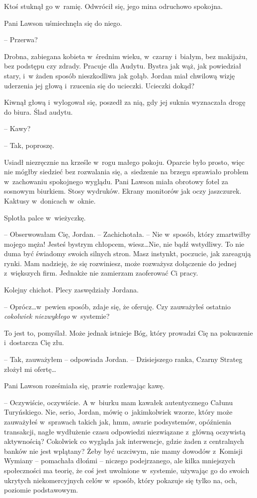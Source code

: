 \documentclass[oneside,polish,11pt,sfheadings]{mwbk}
\begin{document}
Ktoś stuknął go w~ramię. Odwrócił się, jego mina odruchowo spokojna.

Pani Lawson uśmiechnęła się do niego.

-- Przerwa?

Drobna, zabiegana kobieta w~średnim wieku, w~czarny i~białym, bez
makijażu, bez podstępu czy zdrady. Pracuje dla Audytu. Bystra jak wąż,
jak powiedział stary, i~w żaden sposób nieszkodliwa jak gołąb. Jordan
miał chwilową wizję uderzenia jej głową i~rzucenia się do ucieczki.
Ucieczki dokąd?

Kiwnął głową i~wylogował się, poszedł za nią, gdy jej suknia
wyznaczała drogę do biura. Ślad audytu.

-- Kawy?

-- Tak, poproszę.

Usiadł niezręcznie na krześle w~rogu małego pokoju. Oparcie było prosto,
więc nie mógłby siedzieć bez rozwalania się, a~siedzenie na brzegu
sprawiało problem w~zachowaniu spokojnego wyglądu. Pani Lawson miała
obrotowy fotel za sosnowym biurkiem. Stosy wydruków. Ekrany monitorów
jak oczy jaszczurek. Kaktusy w~donicach w~oknie.

Splotła palce w~wieżyczkę. 

-- Obserwowałam Cię, Jordan. -- Zachichotała. -- Nie w~sposób, który zmartwiłby mojego męża! Jesteś bystrym chłopcem,
wiesz\ldots Nie, nie bądź wstydliwy. To nie duma być świadomy swoich
silnych stron. Masz instynkt, poczucie, jak zareagują rynki. Mam
nadzieję, że się rozwiniesz, może rozważysz dołączenie do jednej z~większych firm. Jednakże nie zamierzam zaoferować Ci pracy.

Kolejny chichot. Plecy zaswędziały Jordana.

-- Oprócz\ldots w~pewien sposób, zdaje się, że oferuję. Czy zauważyłeś
ostatnio \emph{cokolwiek niezwykłego} w~systemie?

To jest to, pomyślał. Może jednak istnieje Bóg, który prowadzi Cię na
pokuszenie i~dostarcza Cię złu.

-- Tak, zauważyłem -- odpowiada Jordan. -- Dzisiejszego ranka, Czarny
Strateg złożył mi ofertę\ldots

Pani Lawson roześmiała się, prawie rozlewając kawę.

-- Oczywiście, oczywiście. A w~biurku mam kawałek autentycznego Całunu
Turyńskiego. Nie, serio, Jordan, mówię o~jakimkolwiek wzorze, który może
zauważyłeś w~sprawach takich jak, hmm, awarie podsystemów, opóźnienia
transakcji, nagłe wydłużenie czasu odpowiedzi niezwiązane z~główną
oczywistą aktywnością? Cokolwiek co wygląda jak interwencje, gdzie żaden
z centralnych banków nie jest wplątany? Żeby być uczciwym, nie mamy
dowodów z~Komisji Wymiany -- pomachała dłońmi -- niczego podejrzanego, ale
kilka mniejszych społeczności ma teorię, że coś jest uwolnione w~systemie, używając go do swoich ukrytych niekomercyjnych celów w~sposób,
który pokazuje się tylko na, och, poziomie podstawowym.
\end{document}

